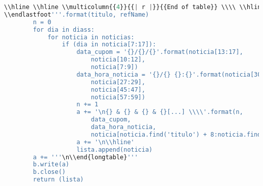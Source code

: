 \begin{lstlisting}[language=Python]
\\hline \\hline \\multicolumn{{4}}{{| r |}}{{End of table}} \\\\ \\hline
\\endlastfoot'''.format(titulo, refName)
        n = 0
        for dia in diass:
            for noticia in noticias:
                if (dia in noticia[7:17]):
                    data_cupom = '{}/{}/{}'.format(noticia[13:17],
                        noticia[10:12],
                        noticia[7:9])
                    data_hora_noticia = '{}/{} {}:{}'.format(noticia[30:32],
                        noticia[27:29],
                        noticia[45:47],
                        noticia[57:59])
                    n += 1
                    a += '\n{} & {} & {} & {}[...] \\\\'.format(n,
                        data_cupom,
                        data_hora_noticia,
                        noticia[noticia.find('titulo') + 8:noticia.find('titulo') + 49])
                    a += '\n\\hline'
                    lista.append(noticia)
        a += '''\n\\end{longtable}'''
        b.write(a)
        b.close()
        return (lista)

\end{lstlisting}